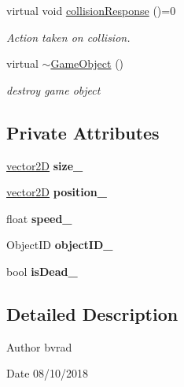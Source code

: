 \begin{DoxyCompactItemize}
\mbox{\label{class_game_object_aafcceed70da5ea5971b82843ea9222e9}} 
virtual void \mbox{\hyperlink{class_game_object_aafcceed70da5ea5971b82843ea9222e9}{collision\+Response}} ()=0
\begin{DoxyCompactList}\small\item\em Action taken on collision. \end{DoxyCompactList}\item 
\mbox{\label{class_game_object_a224d4f6d9dd75c8a6f9d022eaf586fd9}} 
virtual \mbox{\hyperlink{class_game_object_a224d4f6d9dd75c8a6f9d022eaf586fd9}{$\sim$\+Game\+Object}} ()
\begin{DoxyCompactList}\small\item\em destroy game object \end{DoxyCompactList}\end{DoxyCompactItemize}
\subsection*{Private Attributes}
\begin{DoxyCompactItemize}
\item 
\mbox{\label{class_game_object_acf579a65776c0c65955ee6049046c97c}} 
\mbox{\hyperlink{classvector2_d}{vector2D}} {\bfseries size\+\_\+}
\item 
\mbox{\label{class_game_object_a31345500e5c1c68ffd86565e04d698f9}} 
\mbox{\hyperlink{classvector2_d}{vector2D}} {\bfseries position\+\_\+}
\item 
\mbox{\label{class_game_object_a4ac0cfeb4b4fb47f7069f737d24a8de6}} 
float {\bfseries speed\+\_\+}
\item 
\mbox{\label{class_game_object_a3eb63952725ada8dc08282c52a6beb04}} 
Object\+ID {\bfseries object\+I\+D\+\_\+}
\item 
\mbox{\label{class_game_object_a09d2296a020d75e0ffaceee9768405f5}} 
bool {\bfseries is\+Dead\+\_\+}
\end{DoxyCompactItemize}


\subsection{Detailed Description}
\begin{DoxyAuthor}{Author}
bvrad 
\end{DoxyAuthor}
\begin{DoxyDate}{Date}
08/10/2018 
\end{DoxyDate}



